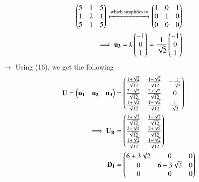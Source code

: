 \documentclass[journal]{IEEEtran}
\begin{document}
\begin{align}
    \begin{pmatrix}5&1&5\\1&2&1\\5&1&5\end{pmatrix}\xleftrightarrow{\text{which simplifies to}}\begin{pmatrix}1&0&1\\0&1&0\\0&0&0\end{pmatrix} \\
    \implies \mathbf{u_3} = k\begin{pmatrix}-1\\0\\1\end{pmatrix} = \frac{1}{\sqrt{2}}\begin{pmatrix}-1\\0\\1\end{pmatrix}
\end{align}
$\rightarrow$ Using (16), we get the following
\begin{align}
    \mathbf{U} = \begin{pmatrix}\mathbf{u_1}&\mathbf{u_2}&\mathbf{u_3}\end{pmatrix} &= \begin{pmatrix}\frac{1+\sqrt{2}}{\sqrt{12}}& \frac{1-\sqrt{2}}{\sqrt{12}}&-\frac{1}{\sqrt{2}}\\\frac{2-\sqrt{2}}{\sqrt{12}}&\frac{2+\sqrt{2}}{\sqrt{12}}&0\\\frac{1+\sqrt{2}}{\sqrt{12}}&\frac{1-\sqrt{2}}{\sqrt{12}}&\frac{1}{\sqrt{2}}\end{pmatrix} \\
    \implies \mathbf{U_R} &= \begin{pmatrix}\frac{1+\sqrt{2}}{\sqrt{12}}&\frac{1-\sqrt{2}}{\sqrt{12}}\\\frac{2-\sqrt{2}}{\sqrt{12}}&\frac{2+\sqrt{2}}{\sqrt{12}}\\\frac{1+\sqrt{2}}{\sqrt{12}}&\frac{1-\sqrt{2}}{\sqrt{12}}\end{pmatrix} \\
    \mathbf{D_1} &= \begin{pmatrix}6+3\sqrt{2}&0&0\\0&6-3\sqrt{2}&0\\0&0&0\end{pmatrix}
\end{align}
\end{document}
